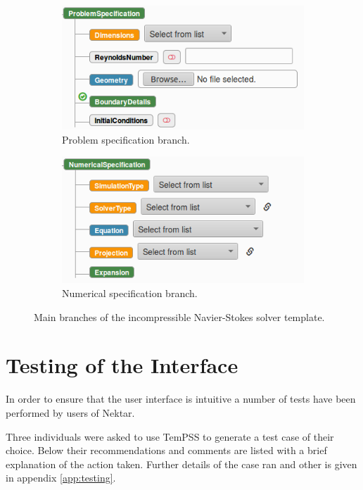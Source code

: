 \documentclass[11pt, a4paper]{report}
\begin{document}
\begin{figure}[!htb]
\centering
\begin{subfigure}{.5\textwidth}
  \centering
  \includegraphics[width=1.\linewidth]{problem_spec}
  \caption{Problem specification branch.}
  \label{fig:problem_spec}
\end{subfigure}%
\begin{subfigure}{.5\textwidth}
  \centering
  \includegraphics[width=1.\linewidth]{numerical_spec}
  \caption{Numerical specification branch.}
  \label{fig:numerical_spec}
\end{subfigure}
\caption{Main branches of the incompressible Navier-Stokes solver template.}
\label{fig:branches}
\end{figure}

\newpage
\section{Testing of the Interface}
In order to ensure that the user interface is intuitive a number of tests have been performed by users of Nektar.

Three individuals were asked to use TemPSS to generate a test case of their choice. Below their recommendations and comments are listed with a brief explanation of the action taken. Further details of the case ran and other is given in appendix \ref{app:testing}.
\end{document}
